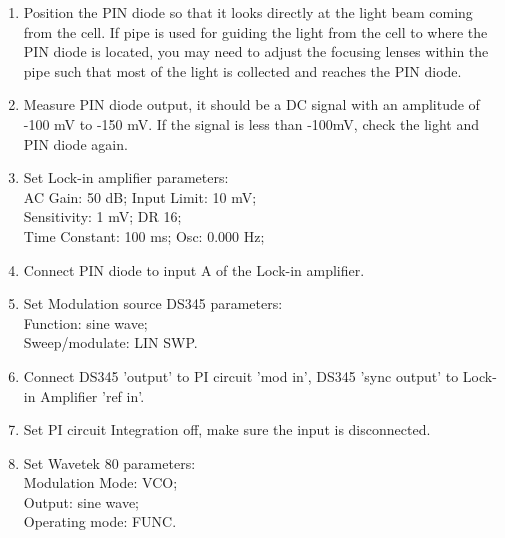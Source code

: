 \begin{enumerate}

\item Position the PIN diode so that it looks directly at the light beam
coming from the cell.  If pipe is used for guiding the light from the cell
to where the PIN diode is located, you may need to adjust the focusing lenses
within the pipe such that most of the light is collected and reaches the PIN 
diode.

\item Measure PIN diode output, it should be a DC signal with an amplitude
of -100 mV to -150 mV.  If the signal is less than -100mV, check the light and 
PIN diode again.

\item Set Lock-in amplifier parameters:\\
\indent    AC Gain:     50 dB;    \hspace{3.2cm}    Input Limit: 10 mV;\\
\indent    Sensitivity:  1 mV;    \hspace{3cm}    DR 16;\\
\indent    Time Constant: 100 ms; \hspace{2cm}    Osc: 0.000 Hz;\\

\item Connect PIN diode to input A of the Lock-in amplifier.

\item Set Modulation source DS345 parameters:\\
\indent     Function:  sine wave;\\
\indent     Sweep/modulate: LIN SWP.\\

\item Connect DS345 'output' to PI circuit 'mod in', 
DS345 'sync output' to Lock-in Amplifier 'ref in'.

\item Set PI circuit Integration off, make sure the input is disconnected.

\item Set Wavetek 80 parameters:\\
\indent Modulation Mode: \hspace{0.5cm} VCO;\\
\indent Output: \hspace{2.3cm}  sine wave;\\
\indent Operating mode: \hspace{0.8cm}  FUNC.\\


\end{enumerate}
